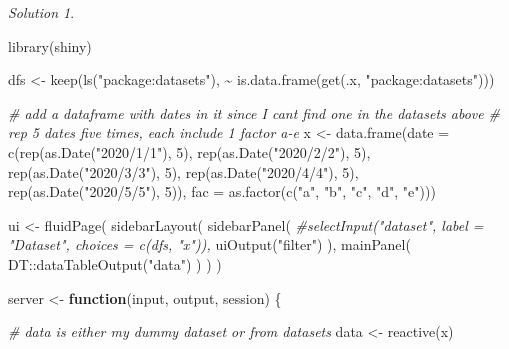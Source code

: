 \documentclass[
]{book}
\newenvironment{Shaded}{\begin{snugshade}}{\end{snugshade}}
\newcommand{\AttributeTok}[1]{\textcolor[rgb]{0.77,0.63,0.00}{#1}}
\newcommand{\CommentTok}[1]{\textcolor[rgb]{0.56,0.35,0.01}{\textit{#1}}}
\newcommand{\ControlFlowTok}[1]{\textcolor[rgb]{0.13,0.29,0.53}{\textbf{#1}}}
\newcommand{\DecValTok}[1]{\textcolor[rgb]{0.00,0.00,0.81}{#1}}
\newcommand{\FunctionTok}[1]{\textcolor[rgb]{0.00,0.00,0.00}{#1}}
\newcommand{\NormalTok}[1]{#1}
\newcommand{\OtherTok}[1]{\textcolor[rgb]{0.56,0.35,0.01}{#1}}
\newcommand{\SpecialCharTok}[1]{\textcolor[rgb]{0.00,0.00,0.00}{#1}}
\newcommand{\StringTok}[1]{\textcolor[rgb]{0.31,0.60,0.02}{#1}}
\theoremstyle{definition}
\theoremstyle{definition}
\theoremstyle{definition}
\theoremstyle{definition}
\theoremstyle{remark}
\newtheorem*{solution}{Solution}
\begin{document}
\begin{solution}
\begin{Shaded}
\begin{Highlighting}[]
\FunctionTok{library}\NormalTok{(shiny)}

\NormalTok{dfs }\OtherTok{\textless{}{-}} \FunctionTok{keep}\NormalTok{(}\FunctionTok{ls}\NormalTok{(}\StringTok{"package:datasets"}\NormalTok{), }\SpecialCharTok{\textasciitilde{}} \FunctionTok{is.data.frame}\NormalTok{(}\FunctionTok{get}\NormalTok{(.x, }\StringTok{"package:datasets"}\NormalTok{)))}

\CommentTok{\# add a dataframe with dates in it since I cant find one in the datasets above}
\CommentTok{\# rep 5 dates five times, each include 1 factor a{-}e}
\NormalTok{x }\OtherTok{\textless{}{-}} \FunctionTok{data.frame}\NormalTok{(}\AttributeTok{date =} \FunctionTok{c}\NormalTok{(}\FunctionTok{rep}\NormalTok{(}\FunctionTok{as.Date}\NormalTok{(}\StringTok{"2020/1/1"}\NormalTok{), }\DecValTok{5}\NormalTok{),}
                         \FunctionTok{rep}\NormalTok{(}\FunctionTok{as.Date}\NormalTok{(}\StringTok{"2020/2/2"}\NormalTok{), }\DecValTok{5}\NormalTok{),}
                         \FunctionTok{rep}\NormalTok{(}\FunctionTok{as.Date}\NormalTok{(}\StringTok{"2020/3/3"}\NormalTok{), }\DecValTok{5}\NormalTok{),}
                         \FunctionTok{rep}\NormalTok{(}\FunctionTok{as.Date}\NormalTok{(}\StringTok{"2020/4/4"}\NormalTok{), }\DecValTok{5}\NormalTok{),}
                         \FunctionTok{rep}\NormalTok{(}\FunctionTok{as.Date}\NormalTok{(}\StringTok{"2020/5/5"}\NormalTok{), }\DecValTok{5}\NormalTok{)),}
                \AttributeTok{fac =} \FunctionTok{as.factor}\NormalTok{(}\FunctionTok{c}\NormalTok{(}\StringTok{"a"}\NormalTok{, }\StringTok{"b"}\NormalTok{, }\StringTok{"c"}\NormalTok{, }\StringTok{"d"}\NormalTok{, }\StringTok{"e"}\NormalTok{)))}

\NormalTok{ui }\OtherTok{\textless{}{-}} \FunctionTok{fluidPage}\NormalTok{(}
  \FunctionTok{sidebarLayout}\NormalTok{(}
    \FunctionTok{sidebarPanel}\NormalTok{(}
      \CommentTok{\#selectInput("dataset", label = "Dataset", choices = c(dfs, "x")),}
      \FunctionTok{uiOutput}\NormalTok{(}\StringTok{"filter"}\NormalTok{)}
\NormalTok{    ),}
    \FunctionTok{mainPanel}\NormalTok{(}
\NormalTok{      DT}\SpecialCharTok{::}\FunctionTok{dataTableOutput}\NormalTok{(}\StringTok{"data"}\NormalTok{)}
\NormalTok{    )}
\NormalTok{  )}
\NormalTok{)}

\NormalTok{server }\OtherTok{\textless{}{-}} \ControlFlowTok{function}\NormalTok{(input, output, session) \{}
  
  \CommentTok{\# data is either my dummy dataset or from datasets}
\NormalTok{  data }\OtherTok{\textless{}{-}} \FunctionTok{reactive}\NormalTok{(x)}
  

\end{Highlighting}
\end{Shaded}
\end{solution}
\end{document}
